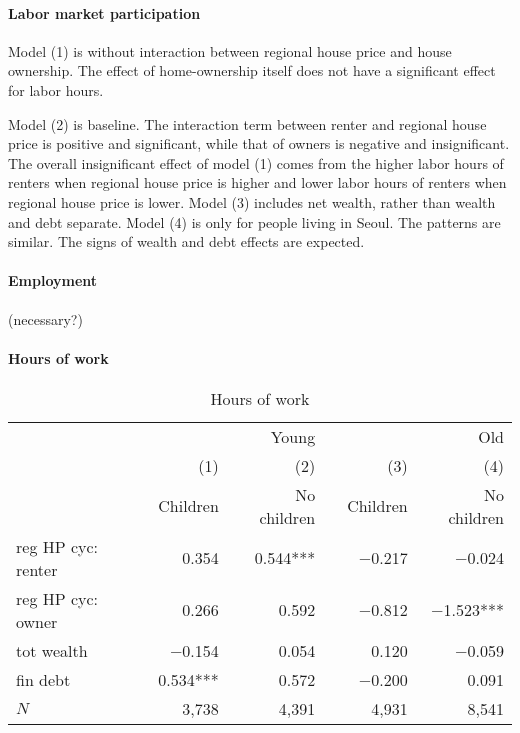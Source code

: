 \documentclass[10pt]{article}
\theoremstyle{definition}
\theoremstyle{remark}
\begin{document}
\paragraph{Labor market participation} Model (1) is without interaction between regional house price and house ownership. The effect of home-ownership itself does not have a significant effect for labor hours.

Model (2) is baseline. The interaction term between renter and regional house price is positive and significant, while that of owners is negative and insignificant. The overall insignificant effect of model (1) comes from the higher labor hours of renters when regional house price is higher and lower labor hours of renters when regional house price is lower. Model (3) includes net wealth, rather than wealth and debt separate. Model (4) is only for people living in Seoul. The patterns are similar. The signs of wealth and debt effects are expected. 

\paragraph{Employment} (necessary?)

\paragraph{Hours of work} 

\begin{table}[pt]
    \centering
    \caption{Hours of work}
    \label{tab:hours_of_work}
    \begin{tabular}{lrrlrr}
        \toprule
        & \multicolumn{2}{r}{Young} &  & \multicolumn{2}{r}{Old} \\
        \cmidrule{2-3} \cmidrule{5-6} 
        & (1) & (2) &  & (3) & (4) \\
        & Children & No children &  & Children & No children \\
        \midrule
        reg HP cyc: renter & 0.354\phantom{***} & 0.544*** &  & $-$0.217\phantom{***} & $-$0.024\phantom{***} \\
        reg HP cyc: owner & 0.266\phantom{***} & 0.592\phantom{***} &  & $-$0.812\phantom{***} & $-$1.523*** \\
        tot wealth & $-$0.154\phantom{***} & 0.054\phantom{***} &  & 0.120\phantom{***} & $-$0.059\phantom{***} \\
        fin debt & 0.534*** & 0.572\phantom{***} &  & $-$0.200\phantom{***} & 0.091\phantom{***} \\
        \midrule
        $N$ & 3,738\phantom{***} & 4,391\phantom{***} &  & 4,931\phantom{***} & 8,541\phantom{***} \\
        \bottomrule
    \end{tabular}
\end{table}
\end{document}
